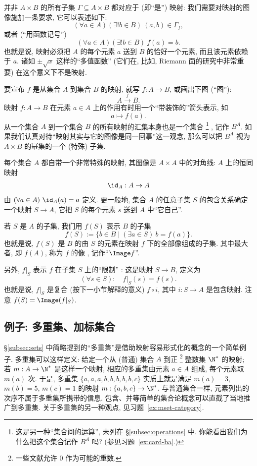 并非 $A \times B$ 的所有子集 $\Gamma \subseteq A \times B$ 都对应于 (即``是'') 映射: 我们需要对映射的图像施加一条要求, 它可以表述如下:
\[
(\forall a \in A) (\exists! b \in B)\ (a,b) \in \Gamma_f,
\]
或者 (``用函数记号'')
\[
(\forall a \in A) (\exists! b \in B)\ f(a) = b.
\]
也就是说, 映射必须把 $A$ 的每个元素 $a$ 送到 $B$ 的恰好一个元素, 而且该元素依赖于 $a$. 诸如 $\pm\sqrt{x}$ 这样的``多值函数'' (它们在, 比如, Riemann 面的研究中非常重要) 在这个意义下不是映射.

要宣布 $f$ 是从集合 $A$ 到集合 $B$ 的映射, 就写 $f : A \to B$, 或画出下图 (``图''):
\[
A \xrightarrow{f} B.
\]
映射 $f : A \to B$ 在元素 $a \in A$ 上的作用有时用一个``带装饰的''箭头表示, 如
\[
a \mapsto f(a).
\]
从一个集合 $A$ 到一个集合 $B$ 的所有映射的汇集本身也是一个集合%
\footnote{这是另一种``集合间的运算'', 未列在 \S\ref{subsec:operations} 中. 你能看出我们为什么把这个集合记作 $B^A$ 吗? (参见习题~\ref{ex:card-ba}.)}%
, 记作 $B^A$. 如果我们认真对待``映射其实与它的图像是同一回事''这一观念, 那么可以把 $B^A$ 视为 $A \times B$ 的幂集的一个 (特殊) 子集.

每个集合 $A$ 都自带一个非常特殊的映射, 其图像是 $A \times A$ 中的对角线: $A$ 上的恒同映射%
\[
\id_A : A \to A
\]
由 $(\forall a \in A)\ \id_A(a) = a$ 定义. 更一般地, 集合 $A$ 的任意子集 $S$ 的包含关系确定一个映射 $S \to A$, 它把 $S$ 的每个元素 $s$ 送到 $A$ 中``它自己''.

若 $S$ 是 $A$ 的子集, 我们用 $f(S)$ 表示 $B$ 的子集
\[
f(S) := \{b \in B \mid (\exists a \in S)\ b = f(a)\}.
\]
也就是说, $f(S)$ 是 $B$ 的由 $S$ 的元素在映射 $f$ 下的全部像组成的子集. 其中最大者, 即 $f(A)$, 称为 $f$ 的像%
, 记作``$\Image f$''.

另外, $f|_S$ 表示 $f$ 在子集 $S$ 上的``限制''%
: 这是映射 $S \to B$, 定义为
\[
(\forall s \in S): \quad f|_S(s) = f(s).
\]
也就是说, $f|_S$ 是复合 (按下一小节解释的意义) $f \circ i$, 其中 $i : S \to A$ 是包含映射. 注意 $f(S) = \Image (f|_S)$.

\subsection{例子: 多重集、加标集合}
\label{subsec:multisets-indexed}

\S\ref{subsec:sets} 中简略提到的``多重集''是借助映射容易形式化的概念的一个简单例子. 多重集可以这样定义: 给定一个从 (普通) 集合 $A$ 到正%
\footnote{一些文献允许 $0$ 作为可能的重数.}%
整数集 $\N^*$ 的映射; 若 $m : A \to \N^*$ 是这样一个映射, 相应的多重集由元素 $a \in A$ 组成, 每个元素取 $m(a)$ 次. 于是, 多重集 $\{a,a,a,b,b,b,b,b,c\}$ 实质上就是满足 $m(a) = 3$, $m(b) = 5$, $m(c) = 1$ 的映射 $m : \{a,b,c\} \to \N^*$. 与普通集合一样, 元素列出的次序不属于多重集所携带的信息. 包含、并等简单的集合论概念可以直截了当地推广到多重集. 关于多重集的另一种观点, 见习题~\ref{ex:mset-category}.

